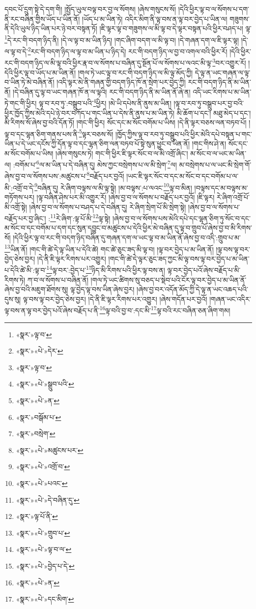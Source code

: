 དབང་པོ་དྲུག་སྟེ་དེ་དག་གི། །སྤྱོད་ཡུལ་བལྟ་བར་བྱ་ལ་སོགས། །ཞེས་གསུངས་སོ། །དེའི་ཕྱིར་ལྟ་བ་ལ་སོགས་པ་དག་ནི་རང་བཞིན་གྱིས་ཡོད་པ་ཡིན་ནོ། །ཡོད་པ་མ་ཡིན་ཏེ། འདིར་མིག་ནི་ལྟ་བས་ན་ལྟ་བར་བྱེད་པ་ཡིན་ལ། གཟུགས་ནི་དེའི་ཡུལ་ཉིད་ཡིན་པར་ཉེ་བར་བསྟན་ཏོ། །ཇི་ལྟར་ལྟ་བ་གཟུགས་ལ་མི་ལྟ་བ་དེ་ལྟར་བསྟན་པའི་ཕྱིར་བཤད་པ། ལྟ་\footnote{«སྣར་»ལྟ་བ་}དེ་རང་གི་བདག་ཉིད་ནི། །དེ་ལ་ལྟ་བ་མ་ཡིན་ཉིད། །གང་ཞིག་བདག་ལ་མི་ལྟ་བ། །དེ་གཞན་དག་ལ་ཇི་ལྟར་ལྟ། །དེ་ལ་ལྟ་བ་དེ་\footnote{«སྣར་»«པེ་»དེར་}རང་གི་བདག་ཉིད་ལ་ལྟ་བ་མ་ཡིན་པ་ཉིད་དེ། རང་གི་བདག་ཉིད་ལ་བྱ་བ་འགལ་བའི་ཕྱིར་རོ། །དེའི་ཕྱིར་རང་གི་བདག་ཉིད་ལ་མི་ལྟ་བའི་ཕྱིར་རྣ་བ་ལ་སོགས་པ་བཞིན་དུ་སྔོན་པོ་ལ་སོགས་པ་ལའང་མི་ལྟ་\footnote{«སྣར་»ལྟ་བ་}བར་འགྱུར་རོ། །དེའི་ཕྱིར་ལྟ་བ་ཡོད་པ་མ་ཡིན་ནོ། །གལ་ཏེ་ཡང་ལྟ་བ་རང་གི་བདག་ཉིད་ལ་མི་ལྟ་མོད་ཀྱི། དེ་ལྟ་ན་ཡང་གཞན་ལ་ལྟ་བ་ཡིན་ཏེ་མེ་བཞིན་ནོ། །འདི་ལྟར་མེ་ནི་གཞན་གྱི་བདག་ཉིད་ཁོ་ན་སྲེག་པར་བྱེད་ཀྱི། རང་གི་བདག་ཉིད་ནི་མ་ཡིན་ནོ། །དེ་བཞིན་དུ་ལྟ་བ་ཡང་གཞན་ཁོ་ན་ལ་ལྟའི། རང་གི་བདག་ཉིད་ནི་མ་ཡིན་ནོ་ཞེ་ན། འདི་ཡང་རིགས་པ་མ་ཡིན་ཏེ་གང་གི་ཕྱིར། ལྟ་བ་རབ་ཏུ་:བསྒྲུབ་པའི་\footnote{«སྣར་»«པེ་»སྒྲུབ་པའི་}ཕྱིར། །མེ་ཡི་དཔེས་ནི་ནུས་མ་ཡིན། །ལྟ་བ་རབ་ཏུ་བསྒྲུབ་པར་བྱ་བའི་ཕྱིར་ཁྱོད་ཀྱིས་མེའི་དཔེ་ཉེ་བར་བཀོད་པ་གང་ཡིན་པ་དེས་ནི་ནུས་པ་མ་ཡིན་ཏེ། མི་ཆོག་པ་དང་། མཐུ་མེད་པ་དང་། མི་རིགས་སོ་ཞེས་བྱ་བའི་དོན་ཏོ། །གང་གི་ཕྱིར། སོང་དང་མ་སོང་བགོམ་པ་ཡིས། །དེ་ནི་ལྟར་བཅས་ལན་བཏབ་པོ། །ལྟ་བ་དང་ལྷན་ཅིག་གནས་པས་ནི་\footnote{«སྣར་»«པེ་»ན་}ལྟར་བཅས་སོ། །ཁྱོད་ཀྱིས་ལྟ་བ་རབ་ཏུ་བསྒྲུབ་པའི་ཕྱིར་མེའི་དཔེ་བསྟན་པ་གང་ཡིན་པ་དེ་ཡང་དངོས་ཀྱི་དོན་ལྟ་བ་དང་ལྷན་ཅིག་ལན་བཏབ་པོ་སྟེ་སུན་ཕྱུང་བ་ཡིན་ནོ། །གང་གིས་ཤེ་ན། སོང་དང་མ་སོང་བགོམ་པ་ཡིས། །ཞེས་གསུངས་ཏེ། གང་གི་ཕྱིར་ཇི་ལྟར་སོང་བ་ལ་མི་འགྲོ་ཞིང་། མ་སོང་བ་ལ་ཡང་མ་ཡིན་ལ། :བགོམ་པ་\footnote{«སྣར་»བསྒོམ་པ་}ལ་མ་ཡིན་པ་དེ་བཞིན་དུ། མེས་ཀྱང་བསྲེགས་པ་ལ་མི་སྲེག་\footnote{«སྣར་»བསྲེག་}ལ། མ་བསྲེགས་པ་ལ་ཡང་མི་སྲེག་གོ་ཞེས་བྱ་བ་ལ་སོགས་པས་:མཚུངས་པ་\footnote{«སྣར་»«པེ་»མཚུངས་པར་}བརྗོད་པར་བྱའོ། །ཡང་ཇི་ལྟར་སོང་བ་དང་མ་སོང་བ་དང་བགོམ་པ་ལ་མི་:འགྲོ་བ་དེ་\footnote{«སྣར་»«པེ་»འགྲོ་བ་}བཞིན་དུ། རེ་ཞིག་བལྟས་ལ་མི་ལྟ་སྟེ། །མ་བལྟས་:པ་ལའང་\footnote{«སྣར་»«པེ་»པའང་}ལྟ་བ་མིན། །བལྟས་དང་མ་བལྟས་མ་གཏོགས་པར། །ལྟ་བཞིན་ཤེས་པར་མི་འགྱུར་རོ། །ཞེས་བྱ་བ་ལ་སོགས་པ་བརྗོད་པར་བྱའོ། །ཇི་ལྟར། རེ་ཞིག་འགྲོ་པོ་མི་འགྲོ་སྟེ། །ཞེས་བྱ་བ་ལ་སོགས་པ་བཤད་པ་དེ་བཞིན་དུ། རེ་ཞིག་སྲེག་པོ་མི་སྲེག་སྟེ། །ཞེས་བྱ་བ་ལ་སོགས་པ་བརྗོད་པར་བྱ་ཞིང་། :\footnote{«སྣར་»«པེ་»དེ་བཞིན་དུ་}རེ་ཞིག་:ལྟ་པོ་མི་\footnote{«སྣར་»ལྟ་པོ་ནི་}ལྟ་སྟེ། །ཞེས་བྱ་བ་ལ་སོགས་པས་མེའི་དཔེ་དང་ལྷན་ཅིག་ཏུ་སོང་བ་དང་མ་སོང་བ་དང་བགོམ་པ་དག་དང་སུན་དབྱུང་བ་མཚུངས་པ་དེའི་ཕྱིར་མེ་བཞིན་དུ་ལྟ་བ་གྲུབ་པོ་ཞེས་བྱ་བ་མི་རིགས་སོ། །དེའི་ཕྱིར་ལྟ་བ་རང་གི་བདག་ཉིད་བཞིན་དུ་གཞན་དག་ལ་ཡང་ལྟ་བ་མ་ཡིན་ནོ་ཞེས་བྱ་བ་འདི་:གྲུབ་པ་མ་\footnote{«སྣར་»«པེ་»གྲུབ་པ་}ཡིན་ནོ། །གང་གི་ཚེ་དེ་ལྟ་ཡིན་པ་དེའི་ཚེ། གང་ཚེ་ཅུང་ཟད་མི་ལྟ་བ། །ལྟ་བར་བྱེད་པ་མ་ཡིན་ནོ། །ལྟ་བས་ལྟ་བར་བྱེད་ཅེས་བྱར། །དེ་ནི་ཇི་ལྟར་རིགས་པར་འགྱུར། །གང་གི་ཚེ་དེ་ལྟར་ཅུང་ཟད་ཀྱང་མི་ལྟ་བས་ལྟ་བར་བྱེད་པ་མ་ཡིན་པ་དེའི་ཚེ་མི་:ལྟ་བ་\footnote{«སྣར་»«པེ་»ལྟ་བ་ལ་}ལྟ་བར་:བྱེད་པ་\footnote{«སྣར་»«པེ་»བྱེད་པ་དེ་}ཉིད་མི་རིགས་པའི་ཕྱིར་ལྟ་བས་ན། ལྟ་བར་བྱེད་པའོ་ཞེས་བརྗོད་པ་མི་རིགས་ཏེ། ཀ་བ་ལ་སོགས་པ་བཞིན་ནོ། །གལ་ཏེ་ཡང་ཚིགས་སུ་བཅད་པ་སྡེབ་པའི་ངོར་ལྟ་བར་བྱེད་པ་མ་ཡིན་ནོ་ཞེས་བྱ་བའི་མཇུག་ཐོགས་སུ། ལྟ་བྱེད་ལྟ་བས་ཡིན་ཞེས་བྱར། །ཞེས་བྱ་བར་འདོན་མོད་ཀྱི་དེ་ལྟ་ན་ཡང་འཆད་པའི་དུས་སུ། ལྟ་བས་ལྟ་བར་བྱེད་ཅེས་བྱར། །དེ་ནི་ཇི་ལྟར་རིགས་པར་འགྱུར། །ཞེས་གདོན་པར་བྱའོ། །གཞན་ཡང་འདིར་ལྟ་བས་ན་ལྟ་བར་བྱེད་པའོ་ཞེས་བརྗོད་པ་ནི་\footnote{«སྣར་»«པེ་»ན་}ལྟ་བའི་བྱ་བ་:དང་མི་\footnote{«སྣར་»«པེ་»དང་མིག་}ལྟ་བའི་རང་བཞིན་ཅན་ཞིག་གམ། 